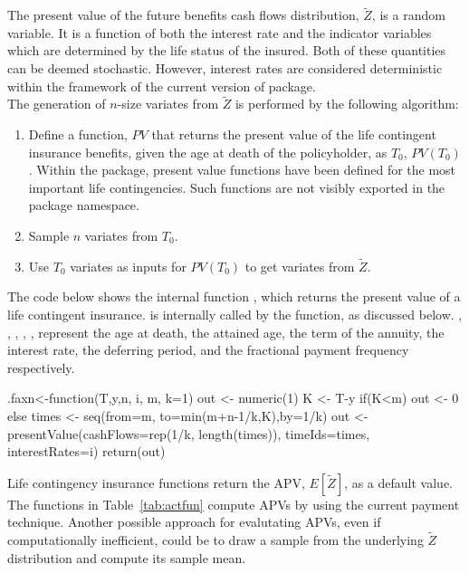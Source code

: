 \documentclass[nojss]{jss}
\begin{document}
The present value of the future benefits cash flows distribution, $\tilde Z$,
is a random variable. It is a function of both the interest rate and the 
indicator variables which are determined by the life status of the insured. Both of these quantities can be deemed stochastic. However, interest rates are considered
deterministic within the framework of the current version of  package.\\
The generation of $n$-size variates from  $\tilde Z$ is performed by the following
algorithm:
\begin{enumerate}
  \item Define a function, $PV$ that returns the present value of the life
  contingent insurance benefits, given the age at death of the policyholder, as
  $T_0$, $PV\left(T_0 \right)$.
  Within the   package, present value functions have been
  defined for the most important life contingencies. Such functions are not
  visibly exported in the package namespace.
  \item Sample $n$ variates from $T_0$.
  \item Use $T_0$ variates as inputs for $PV\left(T_0 \right)$ to get variates
  from $\tilde Z$.
 \end{enumerate}

The code below shows the internal function , which returns the 
present value of a life contingent insurance.  is
internally called by the  function, as discussed below.
, , , , ,  represent the age at
death, the attained age, the term of the annuity, the interest rate, the deferring period, and
the fractional payment frequency respectively.

\begin{Code}
.faxn<-function(T,y,n, i, m, k=1)
{
	out <- numeric(1)
	K <- T-y 
		if(K<m) { 
			out <- 0 
		} else {
		  times <- seq(from=m, to=min(m+n-1/k,K),by=1/k) 
 		  out <- presentValue(cashFlows=rep(1/k, length(times)), 
          timeIds=times, interestRates=i)
		}
	return(out)
}
\end{Code}




Life contingency insurance functions return the APV, $E \left[ \tilde
Z \right]$, as a default value. The functions in Table~\ref{tab:actfun} compute APVs by using the current payment
technique. Another possible approach for evalutating APVs, even if computationally
inefficient, could be to draw a sample from the underlying $\tilde{Z}$ distribution and compute its
sample mean.\\ 
\end{document}
